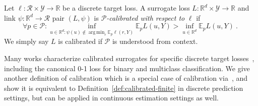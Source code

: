 \documentclass[anon,12pt]{colt2021} %
\newcommand{\reals}{\mathbb{R}}
\newcommand{\E}{\mathbb{E}}
\newcommand{\R}{\mathcal{R}}
\renewcommand{\P}{\mathcal{P}}
\newcommand{\Y}{\mathcal{Y}}
\newcommand{\exploss}[3]{\E_{#3} #1(#2,Y)}
\DeclareMathOperator*{\argmin}{arg\,min}
\begin{document}

\begin{definition}[Calibrated]\label{def:calibrated-finite}
	Let $\ell : \R \times \Y \to \reals$ be a discrete target loss.
	A surrogate loss $L : \reals^d \times \Y \to \reals$  and link $\psi:\reals^d \to \R$ pair $(L, \psi)$ is \emph{$\P$-calibrated with respect to} $\ell$ if 
	\begin{equation}\label{eq:calibration}
	\forall p \in \P: \inf_{u \in \reals^d : \psi(u) \not \in \argmin_r \E_p\ell(r,Y)} \exploss{L}{u}{p} > \inf_{u \in \reals^d} \exploss{L}{u}{p}~.~
	\end{equation}
	We simply say $L$ is calibrated if $\P$ is understood from context.
\end{definition}

Many works characterize calibrated surrogates for specific discrete target losses~\citep{zhang2004statistical,lin2004note,bartlett2006convexity,tewari2007consistency}, including the canonical 0-1 loss for binary and multiclass classification.
We give another definition of calibration which is a special case of calibration via~\citet{steinwart2008support}, and show it is equivalent to Definition~\ref{def:calibrated-finite} in discrete prediction settings, but can be applied in continuous estimation settings as well.
\end{document}
